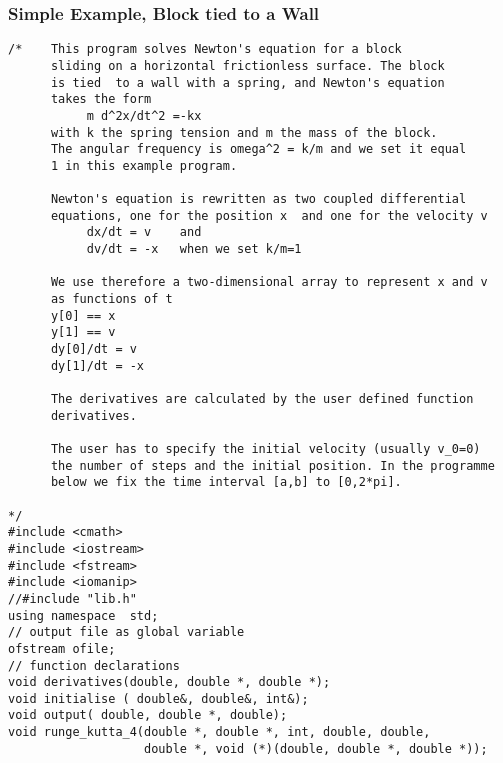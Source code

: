 \documentclass{beamer}
\begin{document}
\begin{frame}
\frametitle{Simple Example, Block tied to a Wall}

\begin{block}{}
\begin{verbatim}
/*    This program solves Newton's equation for a block
      sliding on a horizontal frictionless surface. The block
      is tied  to a wall with a spring, and Newton's equation
      takes the form
           m d^2x/dt^2 =-kx
      with k the spring tension and m the mass of the block.
      The angular frequency is omega^2 = k/m and we set it equal
      1 in this example program. 

      Newton's equation is rewritten as two coupled differential
      equations, one for the position x  and one for the velocity v
           dx/dt = v    and
           dv/dt = -x   when we set k/m=1

      We use therefore a two-dimensional array to represent x and v
      as functions of t
      y[0] == x
      y[1] == v
      dy[0]/dt = v
      dy[1]/dt = -x

      The derivatives are calculated by the user defined function 
      derivatives.

      The user has to specify the initial velocity (usually v_0=0)
      the number of steps and the initial position. In the programme
      below we fix the time interval [a,b] to [0,2*pi].

*/ 
#include <cmath>
#include <iostream>
#include <fstream>
#include <iomanip>
//#include "lib.h"
using namespace  std;
// output file as global variable
ofstream ofile;
// function declarations
void derivatives(double, double *, double *);
void initialise ( double&, double&, int&);
void output( double, double *, double);
void runge_kutta_4(double *, double *, int, double, double, 
                   double *, void (*)(double, double *, double *));


\end{verbatim}
\end{block}
\end{frame}
\end{document}
